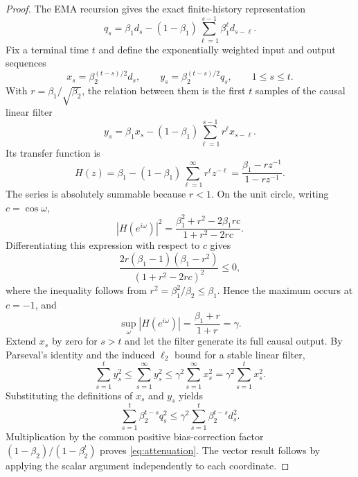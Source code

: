 \documentclass[11pt]{article}
\begin{document}
\begin{proof}
The EMA recursion gives the exact finite-history representation
\[
 q_s=\beta_1d_s-(1-\beta_1)\sum_{\ell=1}^{s-1}\beta_1^{\ell}d_{s-\ell}.
\]
Fix a terminal time $t$ and define the exponentially weighted input and output sequences
\[
 x_s=\beta_2^{(t-s)/2}d_s,
 \qquad y_s=\beta_2^{(t-s)/2}q_s,
 \qquad 1\leq s\leq t.
\]
With $r=\beta_1/\sqrt{\beta_2}$, the relation between them is the first $t$ samples of the causal linear filter
\[
 y_s=\beta_1x_s-(1-\beta_1)\sum_{\ell=1}^{s-1}r^{\ell}x_{s-\ell}.
\]
Its transfer function is
\[
 H(z)=\beta_1-(1-\beta_1)\sum_{\ell=1}^{\infty}r^{\ell}z^{-\ell}
 =\frac{\beta_1-rz^{-1}}{1-rz^{-1}}.
\]
The series is absolutely summable because $r<1$. On the unit circle, writing $c=\cos\omega$,
\[
 |H(e^{i\omega})|^2
 =\frac{\beta_1^2+r^2-2\beta_1 r c}
 {1+r^2-2rc}.
\]
Differentiating this expression with respect to $c$ gives
\[
 \frac{2r(\beta_1-1)(\beta_1-r^2)}
 {(1+r^2-2rc)^2}\leq0,
\]
where the inequality follows from $r^2=\beta_1^2/\beta_2\leq\beta_1$. Hence the maximum occurs at $c=-1$, and
\[
 \sup_{\omega}|H(e^{i\omega})|
 =\frac{\beta_1+r}{1+r}=\gamma.
\]
Extend $x_s$ by zero for $s>t$ and let the filter generate its full causal output. By Parseval's identity and the induced $\ell_2$ bound for a stable linear filter,
\[
 \sum_{s=1}^{t}y_s^2
 \leq\sum_{s=1}^{\infty}y_s^2
 \leq\gamma^2\sum_{s=1}^{\infty}x_s^2
 =\gamma^2\sum_{s=1}^{t}x_s^2.
\]
Substituting the definitions of $x_s$ and $y_s$ yields
\[
 \sum_{s=1}^{t}\beta_2^{t-s}q_s^2
 \leq\gamma^2\sum_{s=1}^{t}\beta_2^{t-s}d_s^2.
\]
Multiplication by the common positive bias-correction factor $(1-\beta_2)/(1-\beta_2^t)$ proves \eqref{eq:attenuation}. The vector result follows by applying the scalar argument independently to each coordinate.
\end{proof}
\end{document}
